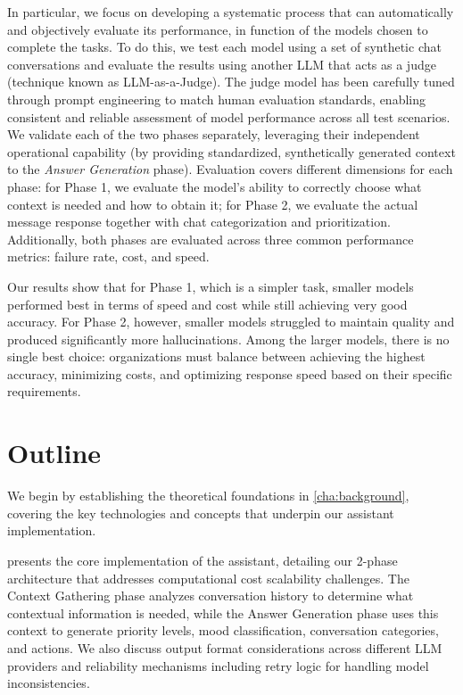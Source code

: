 
In particular, we focus on developing a systematic process that can automatically and objectively evaluate its performance, in function of the models chosen to complete the tasks.
To do this, we test each model using a set of synthetic chat conversations and evaluate the results using another LLM that acts as a judge (technique known as LLM-as-a-Judge).
The judge model has been carefully tuned through prompt engineering to match human evaluation standards, enabling consistent and reliable assessment of model performance across all test scenarios.
We validate each of the two phases separately, leveraging their independent operational capability (by providing standardized, synthetically generated context to the \textit{Answer Generation} phase).
Evaluation covers different dimensions for each phase: for Phase 1, we evaluate the model's ability to correctly choose what context is needed and how to obtain it; for Phase 2, we evaluate the actual message response together with chat categorization and prioritization.
Additionally, both phases are evaluated across three common performance metrics: failure rate, cost, and speed.

Our results show that for Phase 1, which is a simpler task, smaller models performed best in terms of speed and cost while still achieving very good accuracy.
For Phase 2, however, smaller models struggled to maintain quality and produced significantly more hallucinations.
Among the larger models, there is no single best choice: organizations must balance between achieving the highest accuracy, minimizing costs, and optimizing response speed based on their specific requirements.

\section{Outline}

We begin by establishing the theoretical foundations in \cref{cha:background}, covering the key technologies and concepts that underpin our assistant implementation.

 presents the core implementation of the assistant, detailing our 2-phase architecture that addresses computational cost scalability challenges.
The Context Gathering phase analyzes conversation history to determine what contextual information is needed, while the Answer Generation phase uses this context to generate priority levels, mood classification, conversation categories, and actions.
We also discuss output format considerations across different LLM providers and reliability mechanisms including retry logic for handling model inconsistencies.

